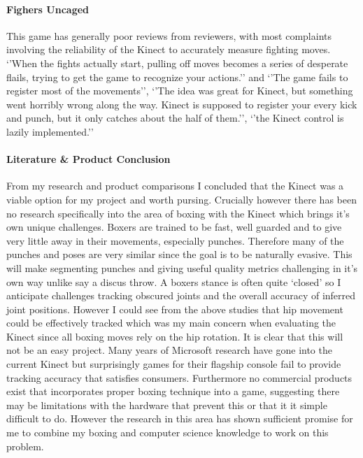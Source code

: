 \paragraph{Fighers Uncaged}
This game has generally poor reviews from reviewers, with most complaints involving the reliability of the Kinect to accurately measure fighting moves. \cite{gamerev1} `'When the fights actually start, pulling off moves becomes a series of desperate flails, trying to get the game to recognize your actions.''\cite{gamerev2} 
and `'The game fails to register most of the movements'', `'The idea was great for Kinect, but something went horribly wrong along the way. Kinect is supposed to register your every kick and punch, but it only catches about the half of them.'', `'the Kinect control is lazily implemented.''\cite{gamerev3} \newline

\paragraph{Literature \& Product Conclusion}
From my research and product comparisons I concluded that the Kinect was a viable option for my project and worth pursing. Crucially however there has been no research specifically into the area of boxing with the Kinect which brings it's own unique challenges. Boxers are trained to be fast, well guarded and to give very little away in their movements, especially punches. Therefore many of the punches and poses are very similar since the goal is to be naturally evasive. This will make segmenting punches and giving useful quality metrics challenging in it's own way unlike say a discus throw. A boxers stance is often quite `closed' so I anticipate challenges tracking obscured joints and the overall accuracy of inferred joint positions. However I could see from the above studies that hip movement could be effectively tracked which was my main concern when evaluating the Kinect since all boxing moves rely on the hip rotation.
\newline\newline 
It is clear that this will not be an easy project. Many years of Microsoft research have gone into the current Kinect but surprisingly games for their flagship console fail to provide tracking accuracy that satisfies consumers. Furthermore no commercial products exist that incorporates proper boxing technique into a game, suggesting there may be limitations with the hardware that prevent this or that it it simple difficult to do. However the research in this area has shown sufficient promise for me to combine my boxing and computer science knowledge to work on this problem.\clearpage

